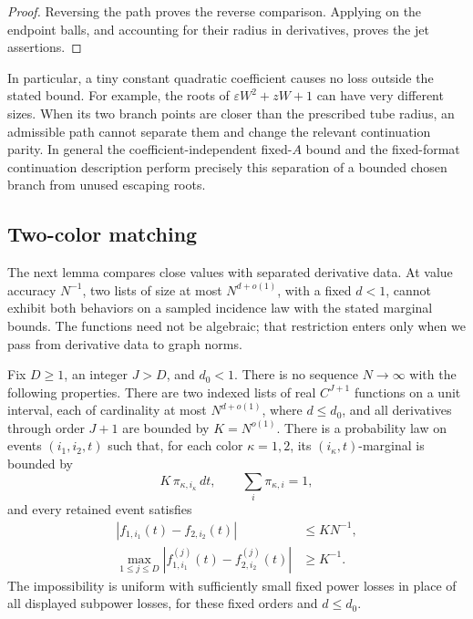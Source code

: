 \begin{proof}
Reversing the path proves the reverse comparison.  Applying
 on the endpoint balls, and accounting for
their radius in derivatives, proves the jet assertions.
\end{proof}

In particular, a tiny constant quadratic coefficient causes no loss
outside the stated bound.  For example, the roots of
\(\varepsilon W^2+zW+1\) can have very different sizes.  When its two
branch points are closer than the prescribed tube radius, an
admissible path cannot separate them and change the relevant
continuation parity.  In general the coefficient-independent
fixed-\(A\) bound and the fixed-format continuation description
perform precisely this separation of a bounded chosen branch from
unused escaping roots.

\subsection{Two-color matching}
\label{a02:two-color-subsection}

The next lemma compares close values with separated derivative data.
At value accuracy \(N^{-1}\), two lists of size at most
\(N^{d+o(1)}\), with a fixed \(d<1\), cannot exhibit both
behaviors on a sampled incidence law with the stated marginal bounds.
The functions need not be algebraic; that restriction enters only
when we pass from derivative data to graph norms.

\begin{lemma}
\label{lem:two-color-matching}
Fix \(D\ge1\), an integer \(J>D\), and \(d_0<1\).
There is no sequence \(N\to\infty\) with the following properties.
There are two indexed lists of real \(C^{J+1}\) functions on a unit
interval, each of cardinality at most \(N^{d+o(1)}\), where \(d\le d_0\),
and all derivatives through order \(J+1\) are bounded by
\(K=N^{o(1)}\).  There is a probability law on events \((i_1,i_2,t)\)
such that, for each color \(\kappa=1,2\), its \((i_\kappa,t)\)-marginal
is bounded by
\begin{equation}
 K\,\pi_{\kappa,i_\kappa}\,dt,
 \qquad
 \sum_i\pi_{\kappa,i}=1,
 \label{a02:index-marginal}
\end{equation}
and every retained event satisfies
\begin{align}
 |f_{1,i_1}(t)-f_{2,i_2}(t)|&\le K N^{-1},\\
 \max_{1\le j\le D}
 |f_{1,i_1}^{(j)}(t)-f_{2,i_2}^{(j)}(t)|&\ge K^{-1}.
 \label{a02:matching-gap}
\end{align}
The impossibility is uniform with sufficiently small fixed power
losses in place of all displayed subpower losses, for these fixed
orders and \(d\le d_0\).
\end{lemma}

